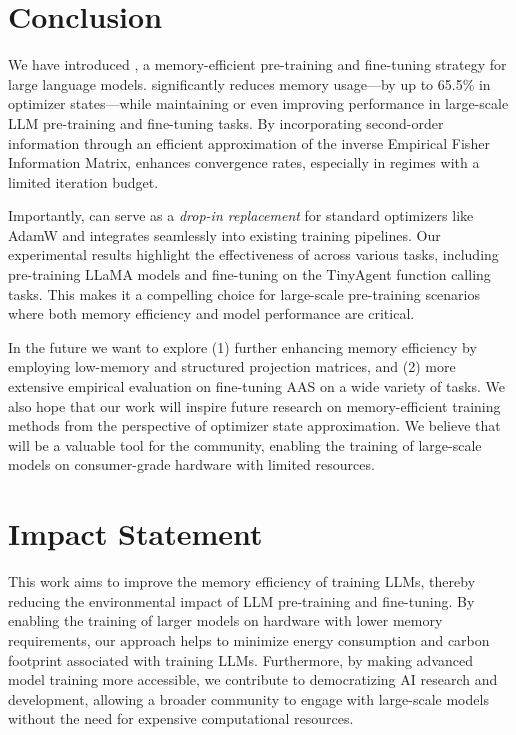 \section{Conclusion}

We have introduced \textit{\lowrank}, a memory-efficient pre-training and fine-tuning strategy for large language models. \textit{\lowrank} significantly reduces memory usage—by up to 65.5\% in optimizer states—while maintaining or even improving performance in large-scale LLM pre-training and fine-tuning tasks. By incorporating second-order information through an efficient approximation of the inverse Empirical Fisher Information Matrix, \textit{\lowrank} enhances convergence rates, especially in regimes with a limited iteration budget.

Importantly, \textit{\lowrank} can serve as a \emph{drop-in replacement} for standard optimizers like AdamW and integrates seamlessly into existing training pipelines. Our experimental results highlight the effectiveness of \textit{\lowrank} across various tasks, including pre-training LLaMA models and fine-tuning on the TinyAgent function calling tasks. This makes it a compelling choice for large-scale pre-training scenarios where both memory efficiency and model performance are critical.

In the future we want to explore (1) further enhancing memory efficiency by employing low-memory and structured projection matrices, and (2) more extensive empirical evaluation on fine-tuning AAS on a wide variety of tasks. We also hope that our work will inspire future research on memory-efficient training methods from the perspective of optimizer state approximation. We believe that \textit{\lowrank} will be a valuable tool for the community, enabling the training of large-scale models on consumer-grade hardware with limited resources.

\section*{Impact Statement}

This work aims to improve the memory efficiency of training LLMs, thereby reducing the environmental impact of LLM pre-training and fine-tuning. By enabling the training of larger models on hardware with lower memory requirements, our approach helps to minimize energy consumption and carbon footprint associated with training LLMs. Furthermore, by making advanced model training more accessible, we contribute to democratizing AI research and development, allowing a broader community to engage with large-scale models without the need for expensive computational resources.